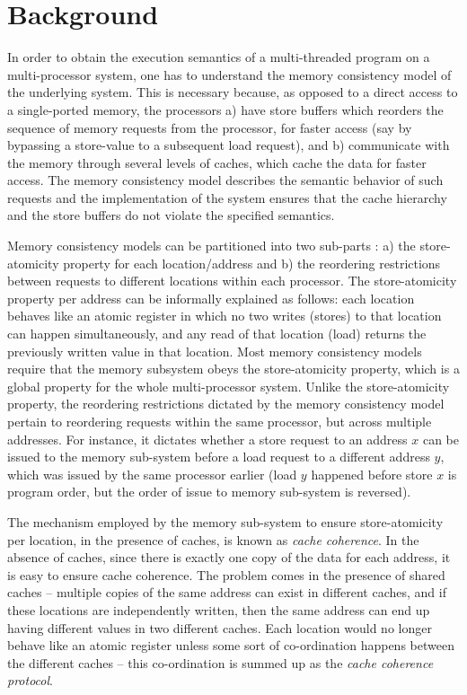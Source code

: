\section{Background}

In order to obtain the execution semantics of a multi-threaded program on a
multi-processor system, one has to understand the memory consistency model of the
underlying system. This is necessary because, as opposed to a direct access to
a single-ported memory, the processors a) have store buffers which reorders the
sequence of memory requests from the processor, for faster access (say by bypassing
a store-value to a subsequent load request), and b) communicate with the memory
through several levels of caches, which cache the data for faster access. The
memory consistency model describes the semantic behavior of such requests and
the implementation of the system ensures that the cache hierarchy and the store
buffers do not violate the specified semantics.

Memory consistency models can be partitioned into two sub-parts
\cite{Arvind-memory-model}: a) the store-atomicity property for each
location/address and b) the reordering restrictions between requests to
different locations within each processor.  The store-atomicity property per address
can be informally explained as follows: each location behaves like an atomic
register in which no two writes (stores) to that location can happen
simultaneously, and any read of that location (load) returns the previously
written value in that location. Most memory consistency models require that
the memory subsystem obeys the store-atomicity property, which is a global
property for the whole multi-processor system. Unlike the store-atomicity property,
the reordering restrictions dictated by the memory consistency model pertain to
reordering requests within the same processor, but across multiple addresses. For
instance, it dictates whether a store request to an address $x$ can be issued
to the memory sub-system before a load request to a different address $y$,
which was issued by the same processor earlier (\ie load $y$ happened before store
$x$ is program order, but the order of issue to memory sub-system is reversed).

The mechanism employed by the memory sub-system to ensure store-atomicity per
location, in the presence of caches, is known as \emph{cache coherence}. In the
absence of caches, since there is exactly one copy of the data for each
address, it is easy to ensure cache coherence. The problem comes in the
presence of shared caches -- multiple copies of the same address can exist in
different caches, and if these locations are independently written, then the
same address can end up having different values in two different caches. Each
location would no longer behave like an atomic register unless some sort of
co-ordination happens between the different caches -- this co-ordination is
summed up as the \emph{cache coherence protocol}.

